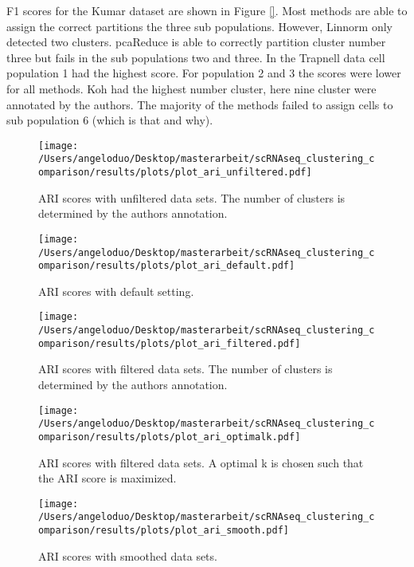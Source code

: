 \documentclass[11pt, a4paper]{article}\usepackage[]{graphicx}\usepackage[]{color}
\begin{document}
F1 scores for the Kumar dataset are shown in Figure \ref{}. Most methods are able to assign the correct partitions the three sub populations. However, Linnorm only detected two clusters. pcaReduce is able to correctly partition cluster number three but fails in the sub populations two and three. In the Trapnell data cell population 1 had the highest score. For population 2 and 3 the scores were lower for all methods.
Koh had the highest number cluster, here nine cluster were annotated by the authors. The majority of the methods failed to assign cells to sub population 6 (which is that and why).


\clearpage
\begin{figure}[!h]
\texttt{[image: /Users/angeloduo/Desktop/masterarbeit/scRNAseq\_clustering\_comparison/results/plots/plot\_ari\_unfiltered.pdf]}
\caption{ARI scores with unfiltered data sets. The number of clusters is determined by the authors annotation. }
\label{fig:ariunfilt}
\end{figure}
\begin{figure}[!h]
\texttt{[image: /Users/angeloduo/Desktop/masterarbeit/scRNAseq\_clustering\_comparison/results/plots/plot\_ari\_default.pdf]}
\caption{ARI scores with default setting. }
\label{fig:aridef}
\end{figure}

\begin{figure}[!h]
\texttt{[image: /Users/angeloduo/Desktop/masterarbeit/scRNAseq\_clustering\_comparison/results/plots/plot\_ari\_filtered.pdf]}
\caption{ARI scores with filtered data sets.  The number of clusters is determined by the authors annotation. }
\label{fig:arifilt}
\end{figure}



\begin{figure}[!h]
\texttt{[image: /Users/angeloduo/Desktop/masterarbeit/scRNAseq\_clustering\_comparison/results/plots/plot\_ari\_optimalk.pdf]}
\caption{ARI scores with filtered data sets. A optimal k is chosen such that the ARI score is maximized. }
\label{fig:arifilt}
\end{figure}

\begin{figure}[!h]
\texttt{[image: /Users/angeloduo/Desktop/masterarbeit/scRNAseq\_clustering\_comparison/results/plots/plot\_ari\_smooth.pdf]}
\caption{ARI scores with smoothed data sets.  }
\label{fig:arifilt}
\end{figure}
\end{document}
